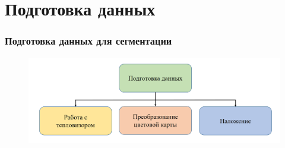 \documentclass[t]{beamer}
\begin{document}
\section{Подготовка данных}

	\begin{frame}
		\frametitle{Подготовка данных для сегментации} 
		\vspace{1cm}
		\begin{figure}
			\centering
			\includegraphics[width = \textwidth]{image/scheme2}	
		\end{figure}
	\end{frame}
\end{document}
